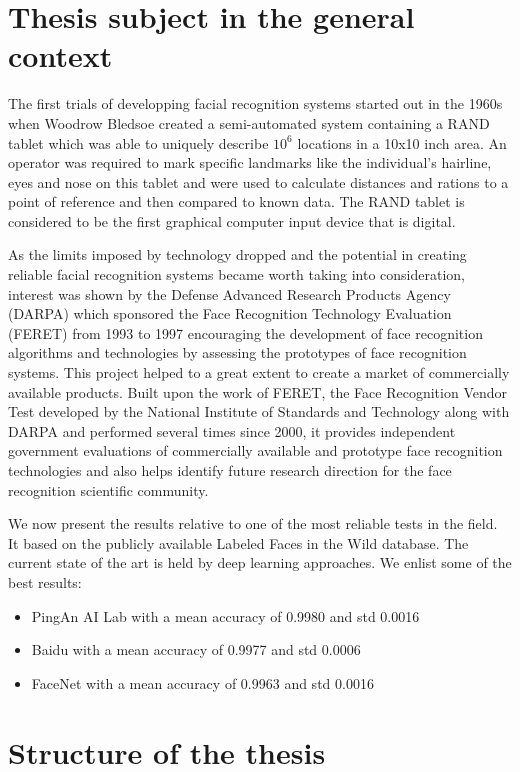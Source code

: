 \section{Thesis subject in the general context}
The first trials of developping facial recognition systems started out in the 1960s when Woodrow Bledsoe created a semi-automated system \cite{DavisMRETO64} containing a RAND tablet which was able to uniquely describe $10^{6}$ locations in a 10x10 inch area.
An operator was required to mark specific landmarks like the individual's  hairline, eyes and nose on this tablet and were used to calculate distances and rations to a point of reference and then compared to known data. The RAND tablet is considered to be the first graphical computer input device that is digital.

As the limits imposed by technology dropped and the potential in creating reliable facial recognition systems became worth taking into consideration, interest was shown by the Defense Advanced Research Products Agency (DARPA) which sponsored the Face Recognition Technology Evaluation (FERET) \cite{PhillipsJMHRSRP00} from 1993 to 1997 encouraging the development of face recognition algorithms and technologies by assessing the prototypes of face recognition systems. This project helped to a great extent to create a market of commercially available products.
Built upon the work of FERET, the Face Recognition Vendor Test \cite{PhillipsGMBTB03} developed by the National Institute of Standards and Technology \cite{FaceNist} along with DARPA and performed several times since 2000, it provides independent government evaluations of commercially available and prototype face recognition technologies and also helps identify future research direction for the face recognition scientific community.

We now present the results relative to one of the most reliable tests in the field. It based on the publicly available Labeled Faces in the Wild database. The current state of the art is held by deep learning approaches. We enlist some of the best results:
\begin{itemize}
	\item PingAn AI Lab with a mean accuracy of 0.9980 and std 0.0016
	\item Baidu with a mean accuracy of 0.9977 and std 0.0006
	\item FaceNet with a mean accuracy of 0.9963 and std 0.0016
\end{itemize}

\section{Structure of the thesis} 

